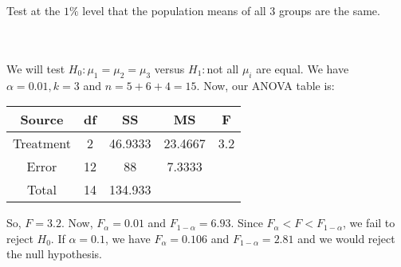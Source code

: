 Test at the $1\%$ level that the population means of all 3 groups are the same.\\\\

\begin{solution}\renewcommand{\qedsymbol}{}\ \\
    We will test $H_0:\mu_1=\mu_2=\mu_3$ versus $H_1:$not all $\mu_i$ are equal. We have
    $\alpha=0.01, k=3$ and $n=5+6+4=15$. Now, our ANOVA table is:

    \begin{center}
        \begin{tabular}{ c|   c   c   c   c  }
            Source & df & SS & MS & F\\
            \hline
            Treatment & 2 & 46.9333 & 23.4667 & 3.2\\
            Error & 12 & 88 & 7.3333 & \\
            Total & 14 & 134.933 &  & 
        \end{tabular}
    \end{center}

    So, $F=3.2$. Now, $F_{\alpha}=0.01$ and $F_{1-\alpha}=6.93$. Since $F_{\alpha}<F<F_{1-\alpha}$, we
    fail to reject $H_0$. If $\alpha=0.1$, we have $F_{\alpha}=0.106$ and $F_{1-\alpha}=2.81$ and we
    would reject the null hypothesis.

\end{solution}